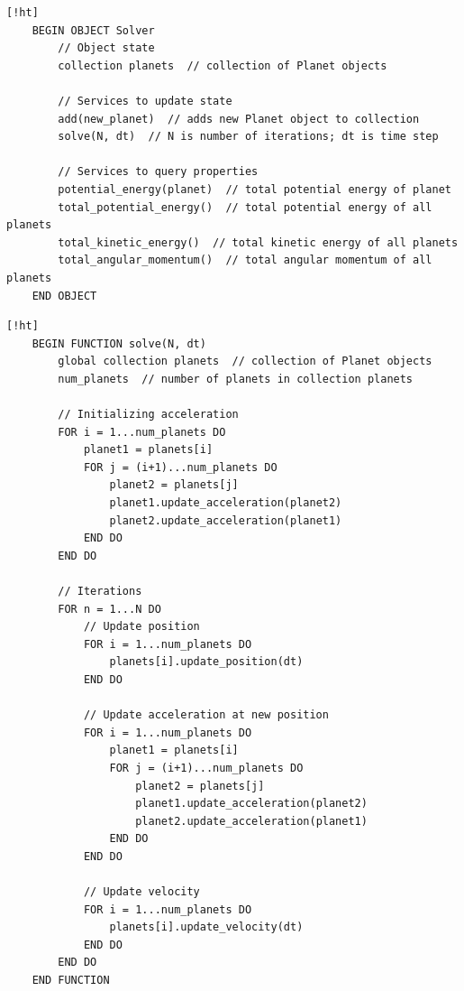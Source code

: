 \documentclass[]{article}
\begin{document}
\begin{lstlisting}[caption={Solver object interface for keeping track of the \lstinline|Planet| objects in the $n$-body problem, and manage the update of their state.},label={lst:verlet-solver-interface}] [!ht]
	BEGIN OBJECT Solver
		// Object state
		collection planets  // collection of Planet objects
		
		// Services to update state
		add(new_planet)  // adds new Planet object to collection
		solve(N, dt)  // N is number of iterations; dt is time step
		
		// Services to query properties
		potential_energy(planet)  // total potential energy of planet
		total_potential_energy()  // total potential energy of all planets
		total_kinetic_energy()  // total kinetic energy of all planets
		total_angular_momentum()  // total angular momentum of all planets
	END OBJECT
\end{lstlisting}

\begin{lstlisting}[caption={The \lstinline|Solver| object's solve() service for executing the Velocity Verlet algorithm on the $n$-body problem.},label={lst:solve}] [!ht]
	BEGIN FUNCTION solve(N, dt)
		global collection planets  // collection of Planet objects
		num_planets  // number of planets in collection planets
		
		// Initializing acceleration
		FOR i = 1...num_planets DO
			planet1 = planets[i]
			FOR j = (i+1)...num_planets DO
				planet2 = planets[j]
				planet1.update_acceleration(planet2)
				planet2.update_acceleration(planet1)
			END DO
		END DO
		
		// Iterations
		FOR n = 1...N DO
			// Update position
			FOR i = 1...num_planets DO
				planets[i].update_position(dt)
			END DO
			
			// Update acceleration at new position
			FOR i = 1...num_planets DO
				planet1 = planets[i]
				FOR j = (i+1)...num_planets DO
					planet2 = planets[j]
					planet1.update_acceleration(planet2)
					planet2.update_acceleration(planet1)
				END DO
			END DO
			
			// Update velocity
			FOR i = 1...num_planets DO
				planets[i].update_velocity(dt)
			END DO
		END DO
	END FUNCTION
\end{lstlisting}
\end{document}
